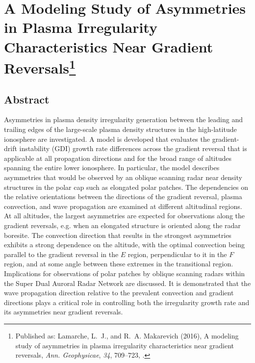 
\chapter[A Modeling Study of Asymmetries in Plasma Irregularity Characteristics Near Gradient Reversals]{A Modeling Study of Asymmetries in Plasma Irregularity Characteristics Near Gradient Reversals\footnote{Published as: {Lamarche}, L.~J., and R.~A. {Makarevich} (2016), A modeling study of asymmetries in plasma irregularity characteristics near gradient reversals, \textit{Ann. Geophysicae}, \textit{34}, 709--723, .}}

\label{sec:paper2}




\section*{Abstract}
Asymmetries in plasma density irregularity generation between the leading and trailing edges of the large-scale plasma density structures in the high-latitude ionosphere are investigated. A model is developed that evaluates the gradient-drift instability (GDI) growth rate differences across the gradient reversal that is applicable at all propagation directions and for the broad range of altitudes spanning the entire lower ionosphere. In particular, the model describes asymmetries that would be observed by an oblique scanning radar near density structures in the polar cap such as elongated polar patches. The dependencies on the relative orientations between the directions of the gradient reversal, plasma convection, and wave propagation are examined at different altitudinal regions. At all altitudes, the largest asymmetries are expected for observations along the gradient reversals, e.g. when an elongated structure is oriented along the radar boresite. The convection direction that results in the strongest asymmetries exhibits a strong dependence on the altitude, with the optimal convection being parallel to the gradient reversal in the \(E\) region, perpendicular to it in the \(F\) region, and at some angle between these extremes in the transitional region. Implications for observations of polar patches by oblique scanning radars within the Super Dual Auroral Radar Network are discussed. It is demonstrated that the wave propagation direction relative to the prevalent convection and gradient directions plays a critical role in controlling both the irregularity growth rate and its asymmetries near gradient reversals.



